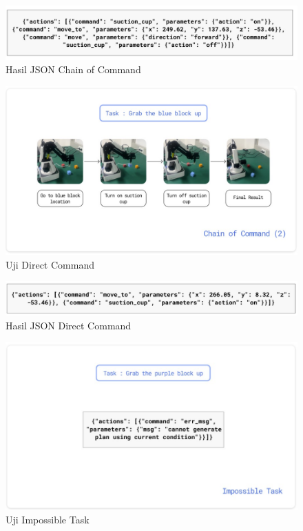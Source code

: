 \begin{figure} [H] \centering
  \includegraphics[scale=0.5]{gambar/coc.jpg}
  \caption{Hasil JSON Chain of Command}
\end{figure}



\begin{figure} [H] \centering
  \includegraphics[scale=0.6]{gambar/ujicoc2.jpg}
  \caption{Uji Direct Command}
\end{figure}

\begin{figure} [H] \centering
  \includegraphics[scale=0.5]{gambar/dc1.jpg}
  \caption{Hasil JSON Direct Command}
\end{figure}

\begin{figure} [H] \centering
  \includegraphics[scale=0.6]{gambar/ujipos.jpg}
  \caption{Uji Impossible Task}
\end{figure}



